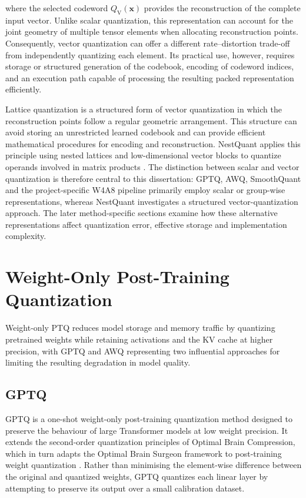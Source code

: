 where the selected codeword \(Q_{\mathrm{V}}(\mathbf{x})\) provides the
reconstruction of the complete input vector\cite{1094577}. Unlike scalar
quantization, this representation can account for the joint geometry of
multiple tensor elements when allocating reconstruction points.
Consequently, vector quantization can offer a different
rate--distortion trade-off from independently quantizing each element.
Its practical use, however, requires storage or structured generation of
the codebook, encoding of codeword indices, and an execution path capable
of processing the resulting packed representation efficiently.

Lattice quantization is a structured form of vector quantization in
which the reconstruction points follow a regular geometric arrangement.
This structure can avoid storing an unrestricted learned codebook and
can provide efficient mathematical procedures for encoding and
reconstruction. NestQuant applies this principle using nested lattices
and low-dimensional vector blocks to quantize operands involved in
matrix products \cite{savkin2025nestquantnestedlatticequantization}. The distinction between scalar and vector quantization is therefore central to this dissertation:
GPTQ, AWQ, SmoothQuant and the project-specific W4A8 pipeline primarily
employ scalar or group-wise representations, whereas NestQuant
investigates a structured vector-quantization approach. The later
method-specific sections examine how these alternative representations
affect quantization error, effective storage and implementation
complexity.



\section{Weight-Only Post-Training Quantization}

Weight-only \ac{PTQ} reduces model storage and memory traffic by quantizing pretrained weights while retaining activations and the \ac{KV} cache at higher precision, with \acs{GPTQ} and \acs{AWQ} representing two influential approaches for limiting the resulting degradation in model quality.

\subsection{\ac{GPTQ}}
\ac{GPTQ} is a one-shot weight-only post-training quantization method
designed to preserve the behaviour of large Transformer models at low
weight precision. It extends the second-order quantization principles of
Optimal Brain Compression, which in turn adapts the Optimal Brain
Surgeon framework to post-training weight quantization
\cite{frantar2023gptqaccurateposttrainingquantization}. Rather than minimising the
element-wise difference between the original and quantized weights,
GPTQ quantizes each linear layer by attempting to preserve its output
over a small calibration dataset.

